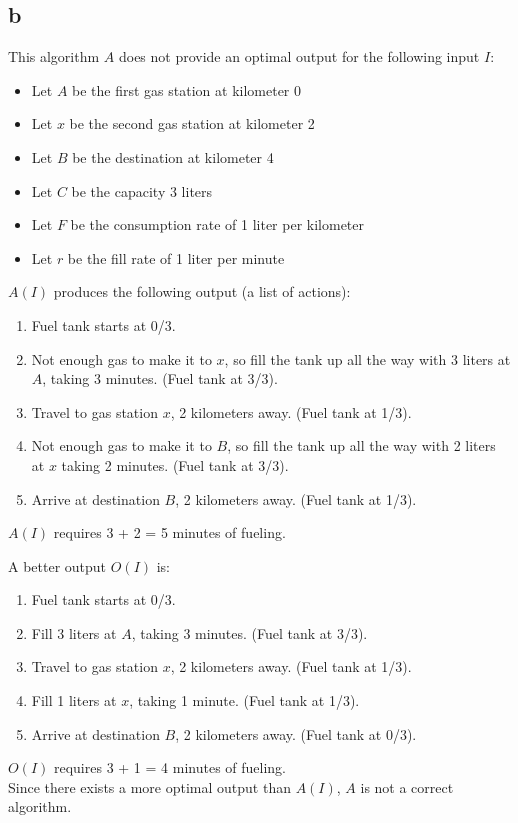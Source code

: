 \documentclass[letterpaper,notitlepage,twoside]{article}
\begin{document}
\subsection*{b}
This algorithm $A$ does not provide an optimal output for the following input $I$:\\
\begin{itemize}
	\item Let $A$ be the first gas station at kilometer 0
	\item Let $x$ be the second gas station at kilometer 2
	\item Let $B$ be the destination at kilometer 4
	\item Let $C$ be the capacity 3 liters
	\item Let $F$ be the consumption rate of 1 liter per kilometer
	\item Let $r$ be the fill rate of 1 liter per minute
\end{itemize}
$A(I)$ produces the following output (a list of actions):
\begin{enumerate}
	\item Fuel tank starts at 0/3.
	\item Not enough gas to make it to $x$, so fill the tank up all the way with 3 liters at $A$, taking 3 minutes. (Fuel tank at 3/3).
	\item Travel to gas station $x$, 2 kilometers away. (Fuel tank at 1/3).
	\item Not enough gas to make it to $B$, so fill the tank up all the way with 2 liters at $x$ taking 2 minutes. (Fuel tank at 3/3).
	\item Arrive at destination $B$, 2 kilometers away. (Fuel tank at 1/3).
\end{enumerate}
$A(I)$ requires 3 + 2 = 5 minutes of fueling.

A better output $O(I)$ is:
\begin{enumerate}
	\item Fuel tank starts at 0/3.
	\item Fill 3 liters at $A$, taking 3 minutes. (Fuel tank at 3/3).
	\item Travel to gas station $x$, 2 kilometers away. (Fuel tank at 1/3).
	\item Fill 1 liters at $x$, taking 1 minute. (Fuel tank at 1/3).
	\item Arrive at destination $B$, 2 kilometers away. (Fuel tank at 0/3).
\end{enumerate}
$O(I)$ requires 3 + 1 = 4 minutes of fueling.\\

Since there exists a more optimal output than $A(I)$, $A$ is not a correct algorithm.
\end{document}
